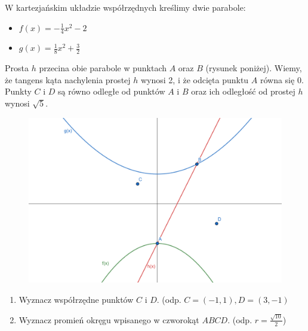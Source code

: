 W kartezjańskim układzie współrzędnych kreślimy dwie parabole:
\begin{itemize}
    \item $f(x) = -\frac{1}{4}x^2-2$
    \item $g(x) = \frac{1}{8}x^2 + \frac{3}{2}$
\end{itemize}
Prosta $h$ przecina obie parabole w punktach $A$ oraz $B$ (rysunek poniżej). Wiemy, że tangens kąta nachylenia prostej $h$ wynosi 2, i że odcięta punktu $A$ równa się $0$. Punkty $C$ i $D$ są równo odległe od punktów $A$ i $B$ oraz ich odległość od prostej $h$ wynosi $\sqrt{5}$. 

\begin{figure}[htbp]
    \centering
    \includegraphics[width=0.6\columnwidth]{figures/zad13.png}
    \label{fig:enter-label}
\end{figure}

\begin{enumerate}
    \item Wyznacz współrzędne punktów $C$ i $D$. (odp. $C=(-1,1), D=(3,-1)$
    \item Wyznacz promień okręgu wpisanego w czworokąt $ABCD$. (odp. $r=\frac{\sqrt{10}}{2}$)
\end{enumerate}